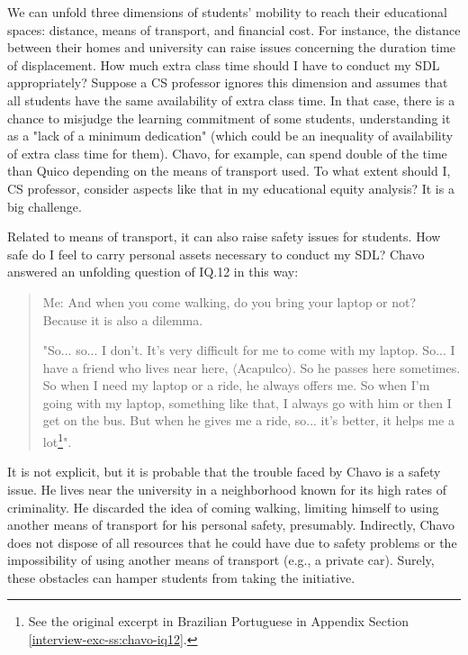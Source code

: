 We can unfold three dimensions of students' mobility to reach their educational spaces: distance, means of transport, and financial cost. For instance, the distance between their homes and university can raise issues concerning the duration time of displacement. How much extra class time should I have to conduct my \gls{SDL} appropriately? Suppose a \gls{CS} professor ignores this dimension and assumes that all students have the same availability of extra class time. In that case, there is a chance to misjudge the learning commitment of some students, understanding it as a "lack of a minimum dedication" (which could be an inequality of availability of extra class time for them). Chavo, for example, can spend double of the time than Quico depending on the means of transport used. To what extent should I, \gls{CS} professor, consider aspects like that in my educational equity analysis? It is a big challenge.

Related to means of transport, it can also raise safety issues for students. How safe do I feel to carry personal assets necessary to conduct my \gls{SDL}? Chavo answered an unfolding question of \gls{IQ}.12 in this way:
\begin{quote}
    \colorbox{black!15}{Me: And when you come walking, do you bring your laptop or not? Because it is} \colorbox{black!15}{also a dilemma.}

    "So... so... I don't. It's very difficult for me to come with my laptop. So... I have a friend who lives near here, $\langle$Acapulco$\rangle$. So he passes here sometimes. So when I need my laptop or a ride, he always offers me. So when I'm going with my laptop, something like that, I always go with him or then I get on the bus. But when he gives me a ride, so... it's better, it helps me a lot\footnote{See the original excerpt in Brazilian Portuguese in Appendix Section \ref{interview-exc-ss:chavo-iq12}.}".
\end{quote}
It is not explicit, but it is probable that the trouble faced by Chavo is a safety issue. He lives near the university in a neighborhood known for its high rates of criminality. He discarded the idea of coming walking, limiting himself to using another means of transport for his personal safety, presumably. Indirectly, Chavo does not dispose of all resources that he could have due to safety problems or the impossibility of using another means of transport (e.g., a private car). Surely, these obstacles can hamper students from taking the initiative.

